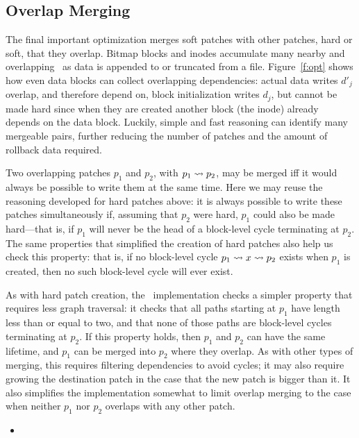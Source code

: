 \subsection{Overlap Merging}
\label{sec:chdescs:merge:overlap}

The final important optimization merges soft patches with other patches,
hard or soft, that they overlap.
%
Bitmap blocks and inodes accumulate many nearby and overlapping \chdescs\
as data is appended to or truncated from a file.
%
Figure~\ref{f:opt} shows how even data blocks can collect overlapping
dependencies: actual data writes $d'_j$ overlap, and therefore depend on,
block initialization writes $d_j$, but cannot be made hard since when they
are created another block (the inode) already depends on the data block.
%
Luckily, simple and fast reasoning can identify many mergeable pairs,
further reducing the number of patches and the amount of rollback data
required.


Two overlapping patches $p_1$ and $p_2$, with $p_1 \leadsto p_2$, may be
merged iff it would always be possible to write them at the same time.
%
Here we may reuse the reasoning developed for hard patches above: it is
always possible to write these patches simultaneously if, assuming that
$p_2$ were hard, $p_1$ could also be made hard---that is, if $p_1$ will
never be the head of a block-level cycle terminating at $p_2$.
%
The same properties that simplified the creation of hard patches also help
us check this property: that is, if no block-level cycle $p_1 \leadsto x
\leadsto p_2$ exists when $p_1$ is created, then no such block-level cycle
will ever exist.



As with hard patch creation, the \Kudos\ implementation checks a simpler
property that requires less graph traversal:
%
it checks that all paths starting at $p_1$ have length less than or equal
to two, and that none of those paths are block-level cycles terminating at
$p_2$.
%
If this property holds, then $p_1$ and $p_2$ can have the same lifetime,
and $p_1$ can be merged into $p_2$ where they overlap.
%
As with other types of merging, this requires filtering dependencies to
avoid cycles; it may also require growing the destination patch in the case
that the new patch is bigger than it.
%
It also simplifies the implementation somewhat to limit overlap merging to
the case when neither $p_1$ nor $p_2$ overlaps with any other patch.

\begin{itemize}
\item
\end{itemize}


